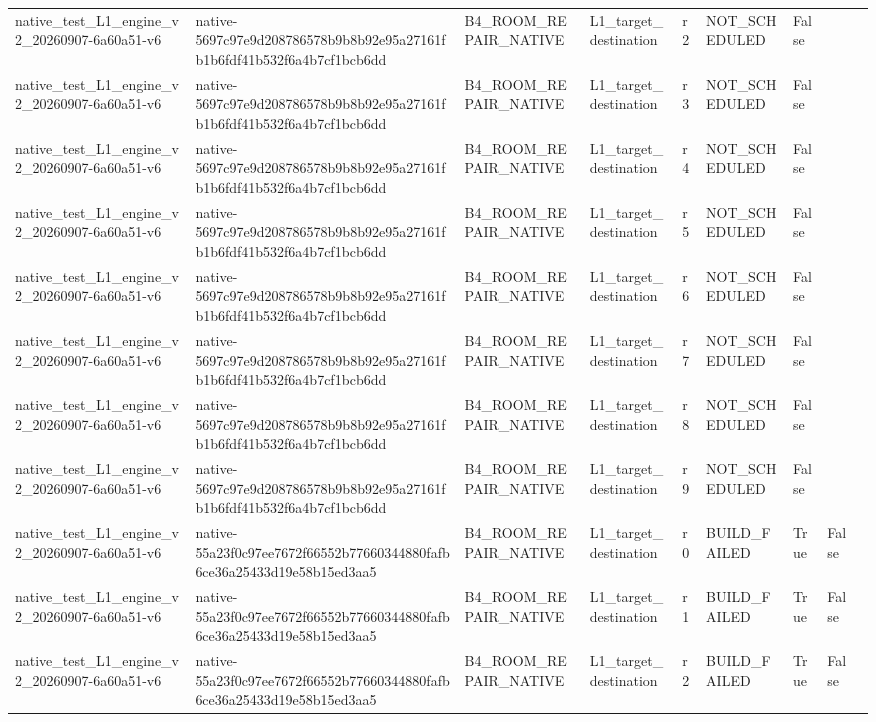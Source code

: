 \begin{tabular}{lllllllll}
native\_test\_L1\_engine\_v2\_20260907-6a60a51-v6 & native-5697c97e9d208786578b9b8b92e95a27161fb1b6fdf41b532f6a4b7cf1bcb6dd & B4\_ROOM\_REPAIR\_NATIVE & L1\_target\_destination & r2 & NOT\_SCHEDULED & False &  &  \\
native\_test\_L1\_engine\_v2\_20260907-6a60a51-v6 & native-5697c97e9d208786578b9b8b92e95a27161fb1b6fdf41b532f6a4b7cf1bcb6dd & B4\_ROOM\_REPAIR\_NATIVE & L1\_target\_destination & r3 & NOT\_SCHEDULED & False &  &  \\
native\_test\_L1\_engine\_v2\_20260907-6a60a51-v6 & native-5697c97e9d208786578b9b8b92e95a27161fb1b6fdf41b532f6a4b7cf1bcb6dd & B4\_ROOM\_REPAIR\_NATIVE & L1\_target\_destination & r4 & NOT\_SCHEDULED & False &  &  \\
native\_test\_L1\_engine\_v2\_20260907-6a60a51-v6 & native-5697c97e9d208786578b9b8b92e95a27161fb1b6fdf41b532f6a4b7cf1bcb6dd & B4\_ROOM\_REPAIR\_NATIVE & L1\_target\_destination & r5 & NOT\_SCHEDULED & False &  &  \\
native\_test\_L1\_engine\_v2\_20260907-6a60a51-v6 & native-5697c97e9d208786578b9b8b92e95a27161fb1b6fdf41b532f6a4b7cf1bcb6dd & B4\_ROOM\_REPAIR\_NATIVE & L1\_target\_destination & r6 & NOT\_SCHEDULED & False &  &  \\
native\_test\_L1\_engine\_v2\_20260907-6a60a51-v6 & native-5697c97e9d208786578b9b8b92e95a27161fb1b6fdf41b532f6a4b7cf1bcb6dd & B4\_ROOM\_REPAIR\_NATIVE & L1\_target\_destination & r7 & NOT\_SCHEDULED & False &  &  \\
native\_test\_L1\_engine\_v2\_20260907-6a60a51-v6 & native-5697c97e9d208786578b9b8b92e95a27161fb1b6fdf41b532f6a4b7cf1bcb6dd & B4\_ROOM\_REPAIR\_NATIVE & L1\_target\_destination & r8 & NOT\_SCHEDULED & False &  &  \\
native\_test\_L1\_engine\_v2\_20260907-6a60a51-v6 & native-5697c97e9d208786578b9b8b92e95a27161fb1b6fdf41b532f6a4b7cf1bcb6dd & B4\_ROOM\_REPAIR\_NATIVE & L1\_target\_destination & r9 & NOT\_SCHEDULED & False &  &  \\
native\_test\_L1\_engine\_v2\_20260907-6a60a51-v6 & native-55a23f0c97ee7672f66552b77660344880fafb6ce36a25433d19e58b15ed3aa5 & B4\_ROOM\_REPAIR\_NATIVE & L1\_target\_destination & r0 & BUILD\_FAILED & True & False &  \\
native\_test\_L1\_engine\_v2\_20260907-6a60a51-v6 & native-55a23f0c97ee7672f66552b77660344880fafb6ce36a25433d19e58b15ed3aa5 & B4\_ROOM\_REPAIR\_NATIVE & L1\_target\_destination & r1 & BUILD\_FAILED & True & False &  \\
native\_test\_L1\_engine\_v2\_20260907-6a60a51-v6 & native-55a23f0c97ee7672f66552b77660344880fafb6ce36a25433d19e58b15ed3aa5 & B4\_ROOM\_REPAIR\_NATIVE & L1\_target\_destination & r2 & BUILD\_FAILED & True & False &  \\

\end{tabular}
